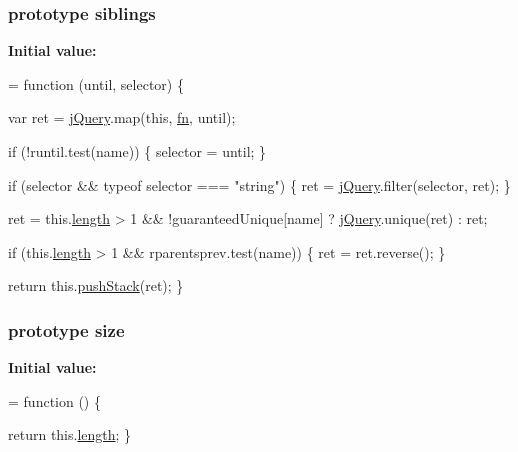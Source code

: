 \subsubsection[{\texorpdfstring{siblings}{siblings}}]{ {\bf prototype} siblings}\hypertarget{jquery-2_82_81-vsdoc_8js_a0e6e8c52ac2dbde17cbca14513a6a388}{}\label{jquery-2_82_81-vsdoc_8js_a0e6e8c52ac2dbde17cbca14513a6a388}
{\bfseries Initial value\+:}
\begin{DoxyCode}
= \textcolor{keyword}{function} (until, selector) \{
        

        var ret = \hyperlink{jquery-2_82_81-vsdoc_8js_add5237586d970a38a81f990e8eb28c6c}{jQuery}.map(\textcolor{keyword}{this}, \hyperlink{jquery-2_82_81-vsdoc_8js_acef6bdaf6b9b20fdcca1ea86f0902c3b}{fn}, until);

        \textcolor{keywordflow}{if} (!runtil.test(name)) \{
            selector = until;
        \}

        \textcolor{keywordflow}{if} (selector && typeof selector === \textcolor{stringliteral}{"string"}) \{
            ret = \hyperlink{jquery-2_82_81-vsdoc_8js_add5237586d970a38a81f990e8eb28c6c}{jQuery}.filter(selector, ret);
        \}

        ret = this.\hyperlink{jquery-2_82_81-vsdoc_8js_aa7de35d58da66d9944ab9cbe82c19640}{length} > 1 && !guaranteedUnique[name] ? \hyperlink{jquery-2_82_81-vsdoc_8js_add5237586d970a38a81f990e8eb28c6c}{jQuery}.unique(ret) : ret;

        \textcolor{keywordflow}{if} (this.\hyperlink{jquery-2_82_81-vsdoc_8js_aa7de35d58da66d9944ab9cbe82c19640}{length} > 1 && rparentsprev.test(name)) \{
            ret = ret.reverse();
        \}

        \textcolor{keywordflow}{return} this.\hyperlink{jquery-2_82_81-vsdoc_8js_afc3a7db1ef2b526338c06c07cecccd44}{pushStack}(ret);
    \}
\end{DoxyCode}
\subsubsection[{\texorpdfstring{size}{size}}]{ {\bf prototype} size}\hypertarget{jquery-2_82_81-vsdoc_8js_a03f3d007acfdfcc364390ec0d718fb34}{}\label{jquery-2_82_81-vsdoc_8js_a03f3d007acfdfcc364390ec0d718fb34}
{\bfseries Initial value\+:}
\begin{DoxyCode}
= \textcolor{keyword}{function} () \{
        

        \textcolor{keywordflow}{return} this.\hyperlink{jquery-2_82_81-vsdoc_8js_aa7de35d58da66d9944ab9cbe82c19640}{length};
    \}
\end{DoxyCode}
